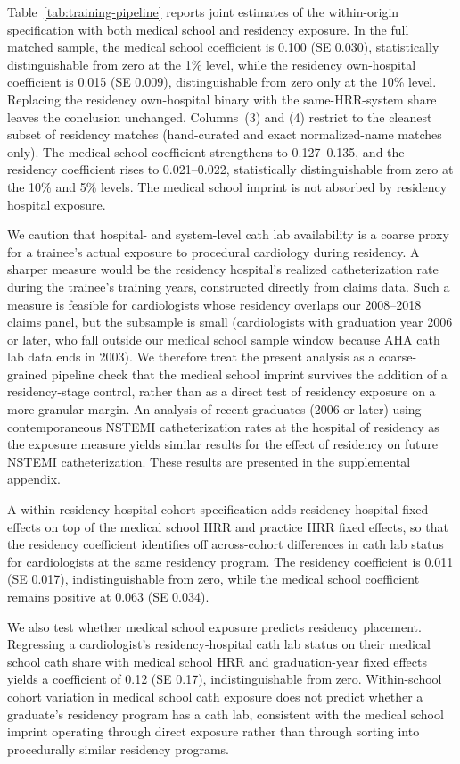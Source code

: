 \documentclass[12pt]{article}
\begin{document}
Table~\ref{tab:training-pipeline} reports joint estimates of the within-origin specification with both medical school and residency exposure. In the full matched sample, the medical school coefficient is 0.100 (SE 0.030), statistically distinguishable from zero at the 1\% level, while the residency own-hospital coefficient is 0.015 (SE 0.009), distinguishable from zero only at the 10\% level. Replacing the residency own-hospital binary with the same-HRR-system share leaves the conclusion unchanged. Columns~(3) and (4) restrict to the cleanest subset of residency matches (hand-curated and exact normalized-name matches only). The medical school coefficient strengthens to 0.127--0.135, and the residency coefficient rises to 0.021--0.022, statistically distinguishable from zero at the 10\% and 5\% levels. The medical school imprint is not absorbed by residency hospital exposure.

We caution that hospital- and system-level cath lab availability is a coarse proxy for a trainee's actual exposure to procedural cardiology during residency. A sharper measure would be the residency hospital's realized catheterization rate during the trainee's training years, constructed directly from claims data. Such a measure is feasible for cardiologists whose residency overlaps our 2008--2018 claims panel, but the subsample is small (cardiologists with graduation year 2006 or later, who fall outside our medical school sample window because AHA cath lab data ends in 2003). We therefore treat the present analysis as a coarse-grained pipeline check that the medical school imprint survives the addition of a residency-stage control, rather than as a direct test of residency exposure on a more granular margin. An analysis of recent graduates (2006 or later) using contemporaneous NSTEMI catheterization rates at the hospital of residency as the exposure measure yields similar results for the effect of residency on future NSTEMI catheterization. These results are presented in the supplemental appendix.

A within-residency-hospital cohort specification adds residency-hospital fixed effects on top of the medical school HRR and practice HRR fixed effects, so that the residency coefficient identifies off across-cohort differences in cath lab status for cardiologists at the same residency program. The residency coefficient is 0.011 (SE 0.017), indistinguishable from zero, while the medical school coefficient remains positive at 0.063 (SE 0.034).

We also test whether medical school exposure predicts residency placement. Regressing a cardiologist's residency-hospital cath lab status on their medical school cath share with medical school HRR and graduation-year fixed effects yields a coefficient of 0.12 (SE 0.17), indistinguishable from zero. Within-school cohort variation in medical school cath exposure does not predict whether a graduate's residency program has a cath lab, consistent with the medical school imprint operating through direct exposure rather than through sorting into procedurally similar residency programs.
\end{document}
